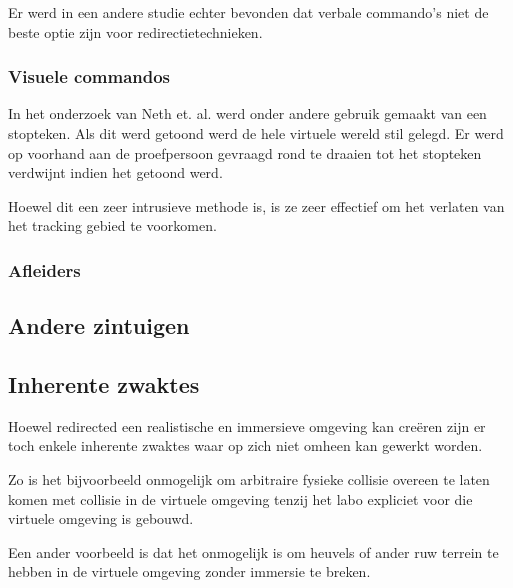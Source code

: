 \documentclass[a4paper,12pt]{article}
\begin{document}
Er werd in een andere studie \cite{peck09} echter bevonden dat verbale commando's 
niet de beste optie zijn voor redirectietechnieken.


\subsubsection{Visuele commandos}
In het onderzoek van Neth et. al. \cite{neth12} werd onder andere gebruik gemaakt
van een stopteken. Als dit werd getoond werd de hele virtuele wereld stil gelegd.
Er werd op voorhand aan de proefpersoon gevraagd rond te draaien tot het 
stopteken verdwijnt indien het getoond werd.

Hoewel dit een zeer intrusieve methode is, is ze zeer effectief om het verlaten
van het tracking gebied te voorkomen.


\subsubsection{Afleiders}


\subsection{Andere zintuigen}


\subsection{Inherente zwaktes}
Hoewel redirected een realistische en immersieve omgeving kan cre\"eren zijn er
toch enkele inherente zwaktes waar op zich niet omheen kan gewerkt worden.

Zo is het bijvoorbeeld onmogelijk om arbitraire fysieke collisie overeen te laten
komen met collisie in de virtuele omgeving tenzij het labo expliciet voor die
virtuele omgeving is gebouwd.

Een ander voorbeeld is dat het onmogelijk is om heuvels of ander ruw terrein te
hebben in de virtuele omgeving zonder immersie te breken.
\end{document}
